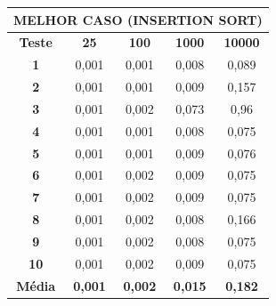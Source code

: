 \documentclass[a4paper, 12pt]{article}
\begin{document}
\begin{minipage}{1.0\textwidth}
  \begin{minipage}[c]{0.49\textwidth}
  \centering
\begin{tabular}{ccccc}

                     \multicolumn{ 5}{c}{{\bf MELHOR CASO (INSERTION SORT)}} \\
\hline
{\bf Teste} &   {\bf 25} &  {\bf 100} & {\bf 1000} & {\bf 10000} \\
\hline
   {\bf 1} &      0,001 &      0,001 &      0,008 &      0,089 \\
\hline
   {\bf 2} &      0,001 &      0,001 &      0,009 &      0,157 \\
\hline
   {\bf 3} &      0,001 &      0,002 &      0,073 &       0,96 \\
\hline
   {\bf 4} &      0,001 &      0,001 &      0,008 &      0,075 \\
\hline
   {\bf 5} &      0,001 &      0,001 &      0,009 &      0,076 \\
\hline
   {\bf 6} &      0,001 &      0,002 &      0,009 &      0,075 \\
\hline
   {\bf 7} &      0,001 &      0,002 &      0,009 &      0,075 \\
\hline
   {\bf 8} &      0,001 &      0,002 &      0,008 &      0,166 \\
\hline
   {\bf 9} &      0,001 &      0,002 &      0,008 &      0,075 \\
\hline
  {\bf 10} &      0,001 &      0,002 &      0,009 &      0,075 \\
\hline
{\bf Média} & {\bf 0,001} & {\bf 0,002} & {\bf 0,015} & {\bf 0,182} \\
\hline
\end{tabular}  


  \end{minipage}
 \hfill
 \begin{minipage}[c]{0.49\textwidth}
 \centering
{}

\end{minipage}
\end{minipage}
\end{document}
